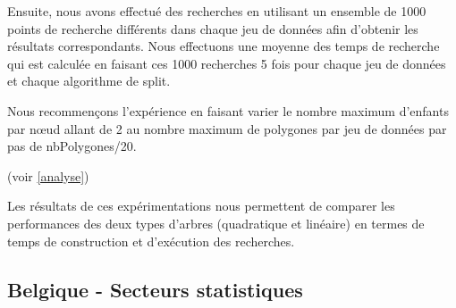 \documentclass {article}
\begin{document}
Ensuite, nous avons effectué des recherches en utilisant un ensemble de 1000 points de recherche différents
dans chaque jeu de données afin d'obtenir les résultats correspondants.
Nous effectuons une moyenne des temps de recherche qui est calculée en faisant ces 1000 recherches 5 fois 
pour chaque jeu de données et chaque algorithme de split.

Nous recommençons l'expérience en faisant varier le nombre maximum d'enfants par nœud allant de 2 au nombre
maximum de polygones par jeu de données par pas de nbPolygones/20.

(voir \ref{analyse})

Les résultats de ces expérimentations nous permettent de comparer les performances des deux types d'arbres
(quadratique et linéaire) en termes de temps de construction et d'exécution des recherches.


\subsection {Belgique - Secteurs statistiques}\label{belgique}
\end{document}
